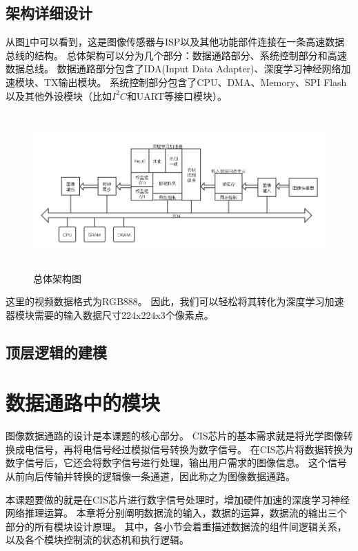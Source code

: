 \subsection{架构详细设计}
从图\ref{fig:top_arch}中可以看到，这是图像传感器与ISP以及其他功能部件连接在一条高速数据总线的结构。
总体架构可以分为几个部分：数据通路部分、系统控制部分和高速数据总线。
数据通路部分包含了IDA(Input Data Adapter)、深度学习神经网络加速模块、TX输出模块。
系统控制部分包含了CPU、DMA、Memory、SPI Flash以及其他外设模块（比如$I^2C$和UART等接口模块）。
\begin{figure}[htbp]
    \centering
    \includegraphics[width=15cm,height=6cm]{figures/top_arch.png}
    \caption{总体架构图}
    \label{fig:top_arch}
\end{figure}
这里的视频数据格式为RGB888。
因此，我们可以轻松将其转化为深度学习加速器模块需要的输入数据尺寸224x224x3个像素点。


\subsection{顶层逻辑的建模}




\section{数据通路中的模块}
图像数据通路的设计是本课题的核心部分。
CIS芯片的基本需求就是将光学图像转换成电信号，再将电信号经过模拟信号转换为数字信号。
在CIS芯片将数据转换为数字信号后，它还会将数字信号进行处理，输出用户需求的图像信息。
这个信号从前向后传输并转换的逻辑像一条通道，因此称之为图像数据通路。

本课题要做的就是在CIS芯片进行数字信号处理时，增加硬件加速的深度学习神经网络推理运算。
本章将分别阐明数据流的输入，数据的运算，数据流的输出三个部分的所有模块设计原理。
其中，各小节会着重描述数据流的组件间逻辑关系，以及各个模块控制流的状态机和执行逻辑。

